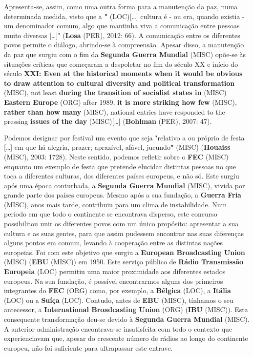 \documentclass[12pt,a4paper]{article}
\begin{document}
Apresenta-se, assim, como uma outra forma para a manutenção da paz, numa determinada medida, visto que a \textbf{"} (LOC)[…] cultura é - ou era, quando existia - um denominador comum, algo que mantinha viva a comunicação entre pessoas muito diversas […]" (\textbf{Losa} (PER), 2012: 66).  A  comunicação  entre  os  diferentes  povos  permite  o  diálogo,  abrindo-se  à compreensão.  Apesar  disso,  a  manutenção  da  paz  que  surgiu  com  o  fim  da  \textbf{Segunda Guerra  Mundial} (MISC)  opõe-se  às  situações  críticas  que  começaram  a  despoletar  no  fim  do século XX e início do século \textbf{XXI: Even at the historical moments when it would be obvious to draw attention to cultural diversity and political transformation} (MISC), not least \textbf{during the transition of socialist states in} (MISC) \textbf{Eastern Europe} (ORG) after 1989, \textbf{it is more striking how few} (MISC), \textbf{rather than how many} (MISC), national  entries  have  responded  to  the  pressing  \textbf{issues  of  the  day} (MISC)[…]  (\textbf{Bohlman} (PER), 2007: 47).

Podemos designar por festival um evento que seja "relativo a ou próprio de festa […] em que há alegria, prazer; aprazível, afável, jucundo\textbf{"} (MISC) (\textbf{Houaiss} (MISC), 2003: 1728). Neste sentido,  podemos  refletir  sobre  o  \textbf{FEC} (MISC)  enquanto  um  exemplo  de  festa  que  pretende elucidar distintas pessoas no que toca a diferentes culturas, dos diferentes países europeus, e não só. Este surgiu após uma época conturbada, a \textbf{Segunda Guerra Mundial} (MISC), vivida por grande parte dos países europeus. Mesmo após a sua fundação, a \textbf{Guerra Fria} (MISC), anos mais tarde, contribuiu para um clima de instabilidade. Num período em que todo o continente se encontrava disperso, este concurso possibilitou unir os diferentes povos com um único propósito: apresentar a sua cultura e as suas gentes, para que assim pudessem encontrar nas  suas  diferenças  alguns  pontos  em  comum,  levando  à  cooperação  entre  as  distintas nações  europeias.  Foi  com  este  objetivo  que  surgiu  a  \textbf{European  Broadcasting  Union} (MISC) (\textbf{EBU} (MISC))  em  1950.  Este  serviço  público  de  \textbf{Rádio  Transmissão  Europeia} (LOC)  permitiu  uma maior  proximidade  aos  diferentes  estados  europeus.  Na  sua  fundação,  é  possível encontrarmos alguns dos primeiros integrantes do \textbf{FEC} (ORG) como, por exemplo, a \textbf{Bélgica} (LOC), a \textbf{Itália} (LOC)  ou  a  \textbf{Suíça} (LOC).  Contudo,  antes  de  \textbf{EBU} (MISC),  tínhamos  o  seu  antecessor,  a  \textbf{International Broadcasting  Union} (ORG)  (\textbf{IBU} (MISC)).  Esta  consequente  transformação  deu-se  devido  à  \textbf{Segunda Guerra Mundial} (MISC). A anterior administração encontrava-se insatisfeita com todo o contexto que experienciavam que, apesar do crescente número de rádios ao longo do continente europeu, não foi suficiente para ultrapassar este entrave.
\end{document}
